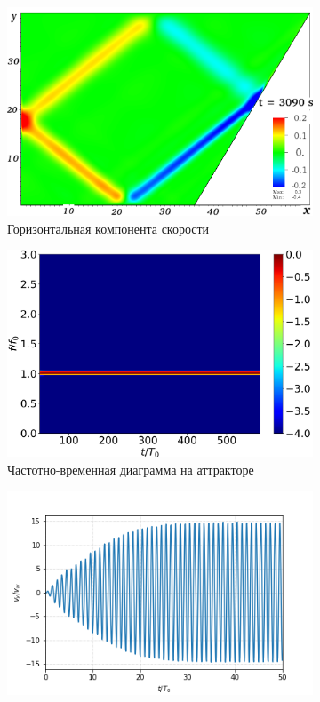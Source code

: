 \begin{figure}[!ht]
    \centering
    \begin{subfigure}[с]{0.45\textwidth}
        \includegraphics[scale=0.15]{pics/H40L60N1ap02dp20w0p63/2D36x36DiagramH40L60N1ap02dp20w0p63Vyn06179.png}
        \caption{Горизонтальная компонента скорости}
    \end{subfigure}
    \begin{subfigure}[с]{0.45\textwidth}
        \includegraphics[scale=0.07]{pics/H40L60N1ap02dp20w0p63/TFspectrumX356Y112N1024.png}
        \caption{Частотно-временная диаграмма на аттракторе}
    \end{subfigure}
    \begin{subfigure}[с]{0.45\textwidth}
        \includegraphics[scale=0.5]{pics/H40L60N1ap02dp20w0p63/vyX355662118341Y112748618745t1000.png}

\end{subfigure}
\end{figure}

